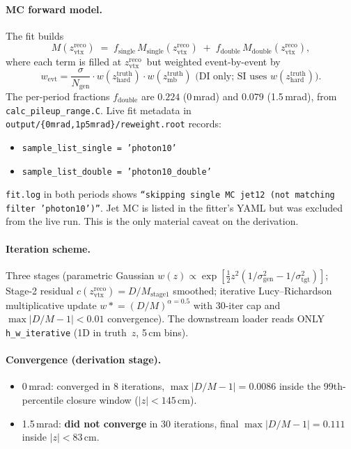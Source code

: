 \documentclass[11pt,a4paper]{article}
\newcommand{\zhard}{\ensuremath{z_{\mathrm{hard}}^{\mathrm{truth}}}\xspace}
\newcommand{\zmb}{\ensuremath{z_{\mathrm{mb}}^{\mathrm{truth}}}\xspace}
\newcommand{\zreco}{\ensuremath{z^{\mathrm{reco}}_{\mathrm{vtx}}}\xspace}
\begin{document}
\paragraph{MC forward model.} The fit builds
\[
  M(\zreco) \;=\; f_{\mathrm{single}}\,M_{\mathrm{single}}(\zreco) \;+\; f_{\mathrm{double}}\,M_{\mathrm{double}}(\zreco),
\]
where each term is filled at \zreco\ but weighted event-by-event by
\[
  w_{\mathrm{evt}} =
  \frac{\sigma}{N_{\mathrm{gen}}}
  \cdot w(\zhard) \cdot w(\zmb) \text{ (DI only; SI uses } w(\zhard)\text{)}.
\]
The per-period fractions $f_{\mathrm{double}}$ are $0.224$ (0\,mrad) and $0.079$ (1.5\,mrad), from \texttt{calc\_pileup\_range.C}. Live fit metadata in \texttt{output/\{0mrad,1p5mrad\}/reweight.root} records:
\begin{itemize}
  \item \texttt{sample\_list\_single = 'photon10'}
  \item \texttt{sample\_list\_double = 'photon10\_double'}
\end{itemize}
\texttt{fit.log} in both periods shows \texttt{``skipping single MC jet12 (not matching filter 'photon10')''}. Jet MC is listed in the fitter's YAML but was excluded from the live run. This is the only material caveat on the derivation.

\paragraph{Iteration scheme.} Three stages (parametric Gaussian $w(z)\propto\exp[\tfrac12 z^2(1/\sigma_{\mathrm{gen}}^2 - 1/\sigma_{\mathrm{tgt}}^2)]$; Stage-2 residual $c(\zreco)=D/M_{\mathrm{stage1}}$ smoothed; iterative Lucy--Richardson multiplicative update $w \mathrel{*}= (D/M)^{\alpha=0.5}$ with 30-iter cap and $\max|D/M-1|<0.01$ convergence). The downstream loader reads ONLY \texttt{h\_w\_iterative} (1D in truth~$z$, 5\,cm bins).

\paragraph{Convergence (derivation stage).}
\begin{itemize}
  \item 0\,mrad: converged in 8 iterations, $\max|D/M-1|=0.0086$ inside the 99th-percentile closure window ($|z|<145$\,cm).
  \item 1.5\,mrad: \textbf{did not converge} in 30 iterations, final $\max|D/M-1|=0.111$ inside $|z|<83$\,cm.
\end{itemize}
\end{document}
